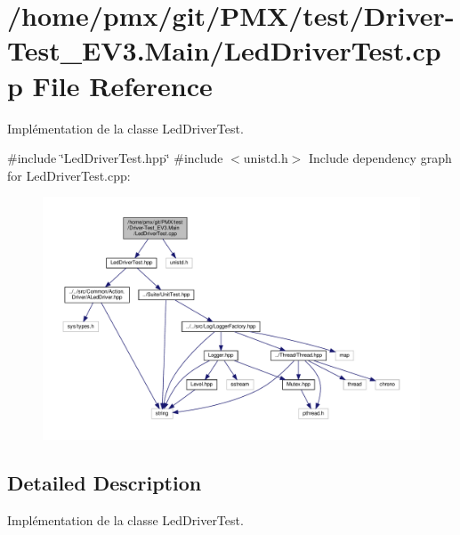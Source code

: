 \hypertarget{Driver-Test__EV3_8Main_2LedDriverTest_8cpp}{}\section{/home/pmx/git/\+P\+M\+X/test/\+Driver-\/\+Test\+\_\+\+E\+V3.Main/\+Led\+Driver\+Test.cpp File Reference}
\label{Driver-Test__EV3_8Main_2LedDriverTest_8cpp}


Implémentation de la classe Led\+Driver\+Test.  


{\ttfamily \#include \char`\"{}Led\+Driver\+Test.\+hpp\char`\"{}}\newline
{\ttfamily \#include $<$unistd.\+h$>$}\newline
Include dependency graph for Led\+Driver\+Test.\+cpp\+:
\nopagebreak
\begin{figure}[H]
\begin{center}
\leavevmode
\includegraphics[width=350pt]{Driver-Test__EV3_8Main_2LedDriverTest_8cpp__incl}
\end{center}
\end{figure}


\subsection{Detailed Description}
Implémentation de la classe Led\+Driver\+Test. 

